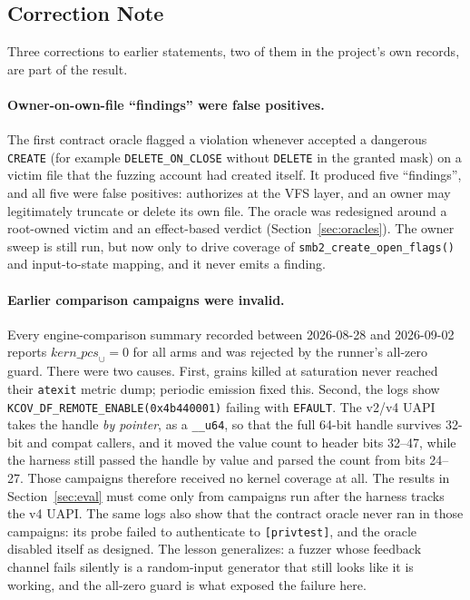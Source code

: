 \documentclass{article}
\begin{document}
\subsection{Correction Note}\label{sec:correction}

Three corrections to earlier statements, two of them in the project's own
records, are part of the result.

\paragraph{Owner-on-own-file ``findings'' were false positives.} The first
contract oracle flagged a violation whenever \ksmbd accepted a dangerous
\texttt{CREATE} (for example \texttt{DELETE\_ON\_CLOSE} without
\texttt{DELETE} in the granted mask) on a victim file that the fuzzing account
had created itself. It produced five ``findings'', and all five were false
positives: \ksmbd authorizes at the VFS layer, and an owner may legitimately
truncate or delete its own file. The oracle was redesigned around a
root-owned victim and an effect-based verdict (Section~\ref{sec:oracles}).
The owner sweep is still run, but now only to drive coverage of
\texttt{smb2\_create\_open\_flags()} and input-to-state mapping, and it never
emits a finding.

\paragraph{Earlier comparison campaigns were invalid.} Every engine-comparison
summary recorded between 2026-08-28 and 2026-09-02 reports
$\mathit{kern\_pcs}_\cup = 0$ for all arms and was rejected by the runner's
all-zero guard. There were two causes. First, grains killed at saturation
never reached their \texttt{atexit} metric dump; periodic emission fixed
this. Second, the logs show
\texttt{KCOV\_DF\_REMOTE\_ENABLE(0x4b440001)} failing with \texttt{EFAULT}.
The \kcovdf v2/v4 UAPI takes the handle \emph{by pointer}, as a
\texttt{\_\_u64}, so that the full 64-bit handle survives 32-bit and compat
callers, and it moved the value count to header bits 32--47, while the harness
still passed the handle by value and parsed the count from bits 24--27. Those
campaigns therefore received no kernel coverage at all. The results in
Section~\ref{sec:eval} must come only from campaigns run after the harness
tracks the v4 UAPI. The same logs also show that the contract oracle never
ran in those campaigns: its probe failed to authenticate to
\texttt{[privtest]}, and the oracle disabled itself as designed. The lesson
generalizes: a fuzzer whose feedback channel
fails silently is a random-input generator that still looks like it is
working, and the all-zero guard is what exposed the failure here.
\end{document}
